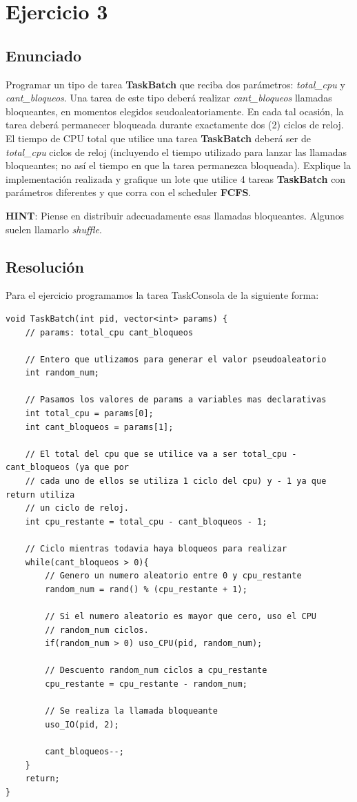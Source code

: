 \section{Ejercicio 3}

\subsection{Enunciado}

Programar un tipo de tarea \textbf{TaskBatch} que reciba dos parámetros: \textit{total\_cpu} y \textit{cant\_bloqueos}. Una tarea de este tipo deberá realizar \textit{cant\_bloqueos} llamadas bloqueantes, en momentos elegidos seudoaleatoriamente. En cada tal ocasión, la tarea deberá permanecer bloqueada durante exactamente dos (2) ciclos de reloj. El tiempo de CPU total que utilice una tarea \textbf{TaskBatch} deberá ser de \textit{total\_cpu} ciclos de reloj (incluyendo el tiempo utilizado para lanzar las llamadas bloqueantes; no así el tiempo en que la tarea permanezca bloqueada). Explique la implementación realizada y grafique un lote que utilice 4 tareas \textbf{TaskBatch} con parámetros diferentes y que corra con el scheduler \textbf{FCFS}. 

\textbf{HINT}: Piense en distribuir adecuadamente esas llamadas bloqueantes. Algunos suelen llamarlo \textit{shuffle}.


\subsection{Resolución}

Para el ejercicio programamos la tarea TaskConsola de la siguiente forma:

\begin{lstlisting}
void TaskBatch(int pid, vector<int> params) {
	// params: total_cpu cant_bloqueos
	
	// Entero que utlizamos para generar el valor pseudoaleatorio
	int random_num;
	
	// Pasamos los valores de params a variables mas declarativas
	int total_cpu = params[0];
	int cant_bloqueos = params[1];
	
	// El total del cpu que se utilice va a ser total_cpu - cant_bloqueos (ya que por 
	// cada uno de ellos se utiliza 1 ciclo del cpu) y - 1 ya que return utiliza 
	// un ciclo de reloj.
	int cpu_restante = total_cpu - cant_bloqueos - 1;

	// Ciclo mientras todavia haya bloqueos para realizar
	while(cant_bloqueos > 0){
		// Genero un numero aleatorio entre 0 y cpu_restante
		random_num = rand() % (cpu_restante + 1);
		
		// Si el numero aleatorio es mayor que cero, uso el CPU
		// random_num ciclos.
		if(random_num > 0) uso_CPU(pid, random_num);
		
		// Descuento random_num ciclos a cpu_restante
		cpu_restante = cpu_restante - random_num;
		
		// Se realiza la llamada bloqueante
		uso_IO(pid, 2);
		
		cant_bloqueos--;
	}
	return;
}
\end{lstlisting}

